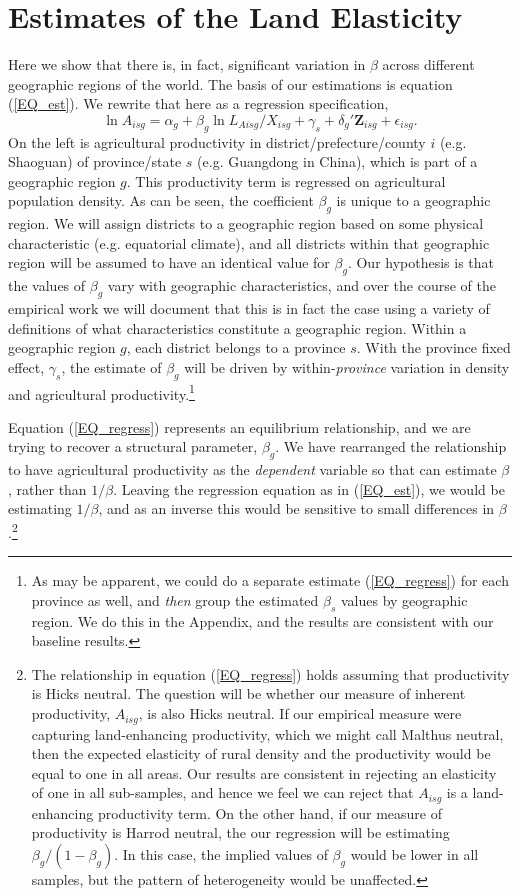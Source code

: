 \documentclass[11pt]{article}
\begin{document}
\section{Estimates of the Land Elasticity}
Here we show that there is, in fact, significant variation in $\beta$ across different geographic regions of the world. The basis of our estimations is equation (\ref{EQ_est}). We rewrite that here as a regression specification,
\begin{equation}
	\ln A_{isg} = \alpha_g + \beta_g \ln L_{Aisg}/X_{isg} + \gamma_{s} + \delta_g' \mathbf{Z}_{isg} + \epsilon_{isg}. \label{EQ_regress}
\end{equation}
On the left is agricultural productivity in district/prefecture/county $i$ (e.g. Shaoguan) of province/state $s$ (e.g. Guangdong in China), which is part of a geographic region $g$. This productivity term is regressed on agricultural population density. As can be seen, the coefficient $\beta_g$ is unique to a geographic region. We will assign districts to a geographic region based on some physical characteristic (e.g. equatorial climate), and all districts within that geographic region will be assumed to have an identical value for $\beta_g$. Our hypothesis is that the values of $\beta_g$ vary with geographic characteristics, and over the course of the empirical work we will document that this is in fact the case using a variety of definitions of what characteristics constitute a geographic region. Within a geographic region $g$, each district belongs to a province $s$. With the province fixed effect, $\gamma_s$, the estimate of $\beta_g$ will be driven by within-\textit{province} variation in density and agricultural productivity.\footnote{As may be apparent, we could do a separate estimate (\ref{EQ_regress}) for each province as well, and \textit{then} group the estimated $\beta_s$ values by geographic region. We do this in the Appendix, and the results are consistent with our baseline results.} 

Equation (\ref{EQ_regress}) represents an equilibrium relationship, and we are trying to recover a structural parameter, $\beta_g$. We have rearranged the relationship to have agricultural productivity as the \textit{dependent} variable so that can estimate $\beta$, rather than $1/\beta$. Leaving the regression equation as in (\ref{EQ_est}), we would be estimating $1/\beta$, and as an inverse this would be sensitive to small differences in $\beta$.\footnote{The relationship in equation (\ref{EQ_regress}) holds assuming that productivity is Hicks neutral. The question will be whether our measure of inherent productivity, $A_{isg}$, is also Hicks neutral. If our empirical measure were capturing land-enhancing productivity, which we might call Malthus neutral, then the expected elasticity of rural density and the productivity would be equal to one in all areas. Our results are consistent in rejecting an elasticity of one in all sub-samples, and hence we feel we can reject that $A_{isg}$ is a land-enhancing productivity term. On the other hand, if our measure of productivity is Harrod neutral, the our regression will be estimating $\beta_g/(1-\beta_g)$. In this case, the implied values of $\beta_g$ would be lower in all samples, but the pattern of heterogeneity would be unaffected.}
\end{document}
